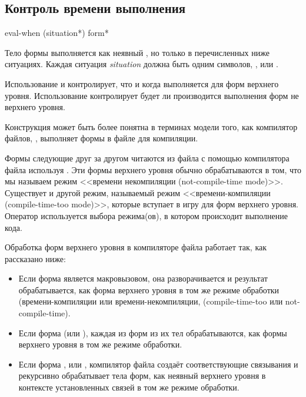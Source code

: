 \subsection{Контроль времени выполнения}

\begin{defspec}
eval-when ({situation}*) {form}*

Тело формы  выполняется как неявный , но только в
перечисленных ниже ситуациях. Каждая ситуация \emph{situation} должна быть
одним символов, ,  или .

Использование  и  контролирует, что и
когда выполняется для форм верхнего уровня. Использование 
контролирует будет ли производится выполнения форм не верхнего уровня.

Конструкция  может быть более понятна в терминах модели того,
как компилятор файлов, , выполняет формы в файле для
компиляции.

Формы следующие друг за другом читаются из файла с помощью компилятора
файла используя . Эти формы верхнего уровня обычно
обрабатываются в том, что мы называем режим <<времени некомпиляции
(not-compile-time mode)>>. Существует и другой режим, называемый режим
<<времени-компиляции (compile-time-too mode)>>, которые вступает в
игру для форм верхнего уровня. Оператор  используется
выбора режима(ов), в котором происходит выполнение кода.

Обработка форм верхнего уровня в компиляторе файла работает так, как
рассказано ниже:

\begin{itemize}

\item Если форма является макровызовом, она разворачивается и результат
  обрабатывается, как форма верхнего уровня в том же режиме обработки
  (времени-компиляции или времени-некомпиляции, (compile-time-too или not-compile-time).

\item Если форма  (или ), каждая из форм из их тел
  обрабатываются, как формы верхнего уровня в том же режиме обработки.

\item Если форма ,  или
  , компилятор файла создаёт соответствующие связывания и
  рекурсивно обрабатывает тела форм, как неявный  верхнего уровня
  в контексте установленных связей в том же режиме обработки.


\end{itemize}
\end{defspec}
